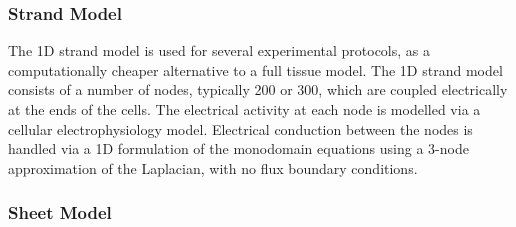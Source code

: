 \subsubsection{Strand Model}

% 

The 1D strand model is used for several experimental protocols, as
a computationally cheaper alternative to a full tissue model.
The 1D strand model consists of a number of nodes, typically 200 or 300, which
are coupled electrically at the ends of the cells.
The electrical activity at each node is modelled via a cellular
electrophysiology model.
Electrical conduction between the nodes is handled via a 1D formulation of the
monodomain equations using a 3-node approximation of the Laplacian, with no
flux boundary conditions.



\subsubsection{Sheet Model}


